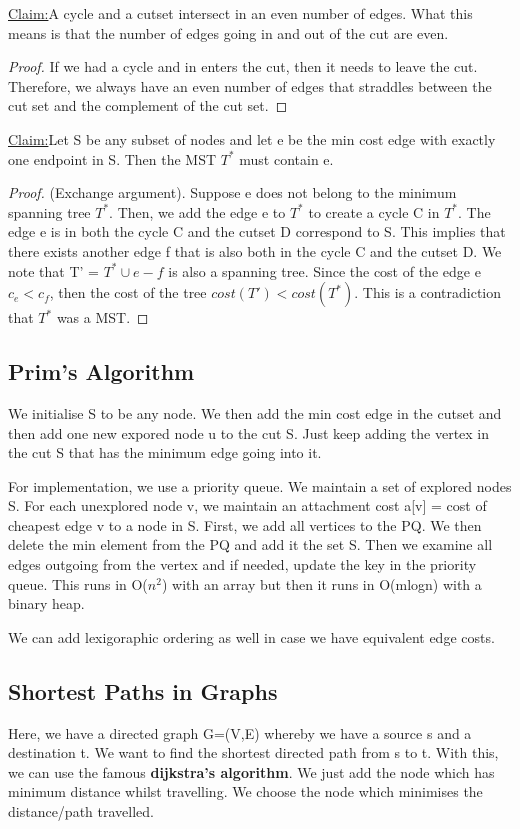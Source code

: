 \documentclass[11pt, oneside]{article}
\theoremstyle{definition}
\newenvironment{claim}[1]{\par\noindent\underline{Claim:}\space#1}{}
\begin{document}
\begin{claim}
  A cycle and a cutset intersect in an even number of edges. What this means is that the number of edges going in and out of the cut are even.
\end{claim}
\begin{proof}
  If we had a cycle and in enters the cut, then it needs to leave the cut. Therefore, we always have an even number of edges that straddles between the cut set and the complement of the cut set.
\end{proof}

\begin{claim}
  Let S be any subset of nodes and let e be the min cost edge with exactly one endpoint in S. Then the MST $T^*$ must contain e.
\end{claim}
\begin{proof}
  (Exchange argument). Suppose e does not belong to the minimum spanning tree $T^*$. Then, we add the edge e to $T^*$ to create a cycle C in $T^*$. The edge e is in both the cycle C and the cutset D correspond to S. This implies that there exists another edge f that is also both in the cycle C and the cutset D. We note that T' = $T^* \cup e - f$ is also a spanning tree. Since the cost of the edge e $c_e < c_f$, then the cost of the tree $cost(T') < cost(T^*)$. This is a contradiction that $T^*$ was a MST.
\end{proof}

\subsection{Prim's Algorithm}
We initialise S to be any node. We then add the min cost edge in the cutset and then add one new expored node u to the cut S. Just keep adding the vertex in the cut S that has the minimum edge going into it.

For implementation, we use a priority queue. We maintain a set of explored nodes S. For each unexplored node v, we maintain an attachment cost a[v] = cost of cheapest edge v to a node in S. First, we add all vertices to the PQ. We then delete the min element from the PQ and add it the set S. Then we examine all edges outgoing from the vertex and if needed, update the key in the priority queue. This runs in O($n^2$) with an array but then it runs in O(mlogn) with a binary heap.

We can add lexigoraphic ordering as well in case we have equivalent edge costs.

\subsection{Shortest Paths in Graphs}
Here, we have a directed graph G=(V,E) whereby we have a source s and a destination t. We want to find the shortest directed path from s to t. With this, we can use the famous \textbf{dijkstra's algorithm}. We just add the node which has minimum distance whilst travelling. We choose the node which minimises the distance/path travelled.
\end{document}

